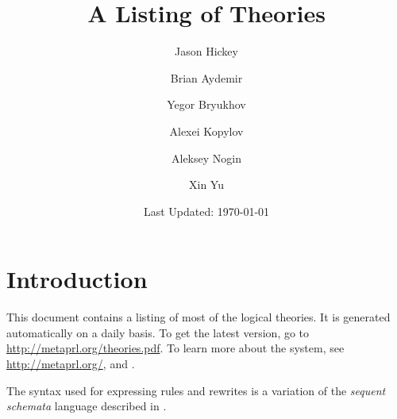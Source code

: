 \documentclass{report}
\begin{document}
\author{Jason Hickey\and Brian Aydemir\and Yegor Bryukhov\and Alexei
Kopylov\and Aleksey Nogin\and Xin Yu}
\title{A Listing of \MetaPRL{} Theories}
\date{Last Updated: \today}
\maketitle
\chapter{Introduction}
This document contains a listing of most of the \MetaPRL{}
logical theories. It is generated automatically on a daily basis. To get the
latest version, go to \url{http://metaprl.org/theories.pdf}. To learn more
about the \MetaPRL{} system, see \url{http://metaprl.org/}, \cite{Hic01} and
\cite{Nog02c}.

The syntax used for expressing \MetaPRL{} rules and rewrites is a variation of the
\emph{sequent schemata} language described in \cite{NH02}.

\sloppy


\printindex



\end{document}
